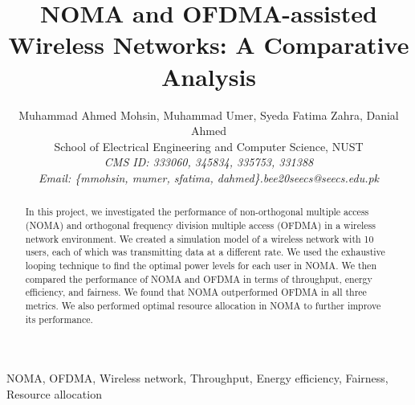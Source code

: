 \documentclass[conference]{IEEEtran}
\begin{document}
\title{NOMA and OFDMA-assisted Wireless Networks: A Comparative Analysis}

\author{Muhammad Ahmed Mohsin, Muhammad Umer, Syeda Fatima Zahra, Danial Ahmed\\
	School of Electrical Engineering and Computer Science, NUST\\
	\textit{CMS ID: 333060, 345834, 335753, 331388}\\
	\textit{Email: \{mmohsin, mumer, sfatima, dahmed\}.bee20seecs@seecs.edu.pk}
}

\maketitle

\begin{abstract}
In this project, we investigated the performance of non-orthogonal multiple access (NOMA) and orthogonal frequency division multiple access (OFDMA) in a wireless network environment. We created a simulation model of a wireless network with 10 users, each of which was transmitting data at a different rate. We used the exhaustive looping technique to find the optimal power levels for each user in NOMA. We then compared the performance of NOMA and OFDMA in terms of throughput, energy efficiency, and fairness. We found that NOMA outperformed OFDMA in all three metrics. We also performed optimal resource allocation in NOMA to further improve its performance.

\end{abstract}

\begin{IEEEkeywords}
NOMA, OFDMA, Wireless network, Throughput, Energy efficiency, Fairness, Resource allocation

\end{IEEEkeywords}
\end{document}
